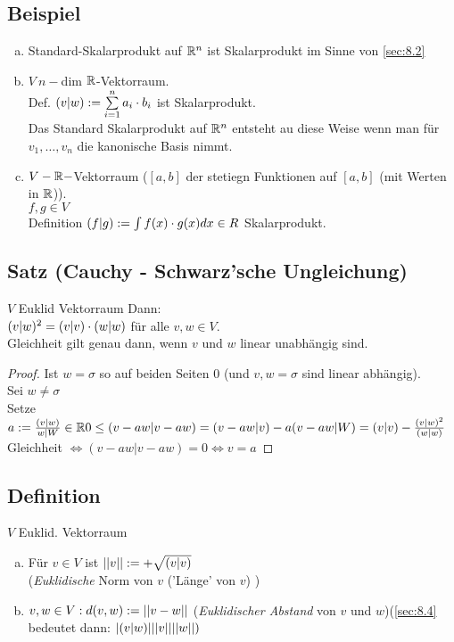 \subsection{Beispiel}\label{sec:\thesubsection}
\begin{enumerate}[a)]
\item Standard-Skalarprodukt auf $\mathbb{R}^n$ ist Skalarprodukt im Sinne von \ref{sec:8.2}
\item $V\ n-$dim $\mathbb{R}$-Vektorraum.\\
Def. $(v|w) := \sum\limits^{n}_{i=1}a_i \cdot b_i$ ist Skalarprodukt.\\
Das Standard Skalarprodukt auf $\mathbb{R}^n$ entsteht au diese Weise wenn man für $v_1,\ldots,v_n$ die kanonische Basis nimmt.
\item $V-\mathbb{R}-$Vektorraum ($[a,b]$ der stetiegn Funktionen auf $[a,b]$ (mit Werten in $\mathbb{R}$)).\\
$f,g \in V$\\
Definition $(f|g) := \int f(x) \cdot g(x) dx \in R$ Skalarprodukt.
\end{enumerate}
\subsection{Satz (Cauchy - Schwarz'sche Ungleichung)}\label{sec:\thesubsection}
$V$ Euklid Vektorraum Dann:\\
$(v|w)^2 = (v|v) \cdot (w|w)$ für alle $v,w \in V$.\\
Gleichheit gilt genau dann, wenn $v$ und $w$ linear unabhängig sind.
\begin{proof}
Ist $w = \sigma$ so auf beiden Seiten 0 (und $v,w = \sigma$ sind linear abhängig).\\
Sei $w \ne \sigma$\\
Setze $a := \frac{(v|w)}{w|W} \in \mathbb{R}\\
0 \leq (v-aw|v-aw) = (v-aw|v)- a(v-aw|W) = (v|v) - \frac{(v|w)^2}{(w|w)}\\$
Gleichheit $\Leftrightarrow (v-aw|v-aw) = 0 \Leftrightarrow v = a$
\end{proof}
\subsection{Definition}\label{sec:\thesubsection}
$V$ Euklid. Vektorraum
\begin{enumerate}[a)]
\item Für $v \in V$ ist $\lvert \lvert v \rvert \rvert := +\sqrt{(v|v)}$\\
(\emph{Euklidische} Norm von $v$ ('Länge' von $v$) )
\item $v,w \in V:\\
d(v,w) := \lvert \lvert v-w \rvert \rvert$ ({\em Euklidischer Abstand} von $v$ und $w$)(\ref{sec:8.4} bedeutet dann: $\lvert (v|w) \rvert \lvert \lvert v \rvert \rvert \lvert \lvert w \rvert \rvert)$
\end{enumerate}
